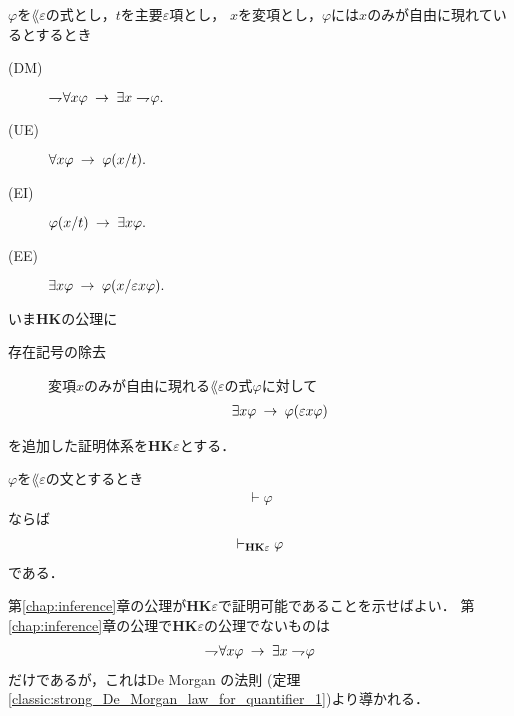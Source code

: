 	\begin{screen}
		\begin{logicalaxm}
			$\varphi$を$\lang{\varepsilon}の$式とし，$t$を主要$\varepsilon$項とし，
			$x$を変項とし，$\varphi$には$x$のみが自由に現れているとするとき
			\begin{description}
				\item[(DM)] $\rightharpoondown\hspace{-0.25em} \forall x \varphi
					\hspace{0.25em}\rightarrow\hspace{0.25em} \exists x \rightharpoondown\hspace{-0.25em} \varphi.$
				
				\item[(UE)] $\forall x \varphi \hspace{0.25em}\rightarrow\hspace{0.25em} \varphi(x/t).$
				
				\item[(EI)] $\varphi(x/t) \hspace{0.25em}\rightarrow\hspace{0.25em} \exists x \varphi.$
				
				\item[(EE)] $\exists x \varphi \hspace{0.25em}\rightarrow\hspace{0.25em} \varphi(x/\varepsilon x \varphi).$
			\end{description}
		\end{logicalaxm}
	\end{screen}
	
	いま{\bf HK}の公理に
	\begin{description}
		\item[存在記号の除去] 
			変項$x$のみが自由に現れる$\lang{\varepsilon}$の式$\varphi$に対して
			\begin{align}
				\exists x \varphi \hspace{0.25em}\rightarrow\hspace{0.25em} \varphi(\varepsilon x \varphi)
			\end{align}
	\end{description}
	を追加した証明体系を{\bf HK$\varepsilon$}とする．
	
	\begin{screen}
		\begin{metathm}
		\label{metathm:Henkin_expansion_1}
			$\varphi$を$\lang{\varepsilon}$の文とするとき
			\begin{align}
				\vdash \varphi
			\end{align}
			ならば
			\begin{align}
				\vdash_{{\scriptsize \mbox{{\bf HK$\varepsilon$}}}} \varphi
			\end{align}
			である．
		\end{metathm}
	\end{screen}
	
	\begin{metaprf}
		第\ref{chap:inference}章の公理が{\bf HK$\varepsilon$}で証明可能であることを示せばよい．
		第\ref{chap:inference}章の公理で{\bf HK$\varepsilon$}の公理でないものは
		\begin{align}
			\rightharpoondown\hspace{-0.25em} \forall x \varphi \hspace{0.25em}\rightarrow\hspace{0.25em} \exists x \rightharpoondown\hspace{-0.25em} \varphi
		\end{align}
		だけであるが，これはDe Morgan の法則
		(定理\ref{classic:strong_De_Morgan_law_for_quantifier_1})より導かれる．
		\QED
	\end{metaprf}
	

